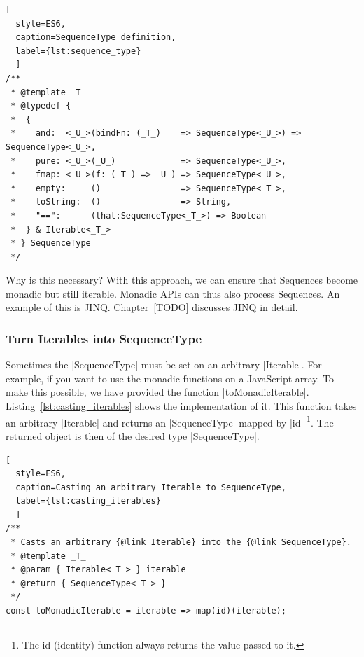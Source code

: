 \begin{lstlisting}[
  style=ES6, 
  caption=SequenceType definition,
  label={lst:sequence_type}
  ]
/**
 * @template _T_
 * @typedef {
 *  {
 *    and:  <_U_>(bindFn: (_T_)    => SequenceType<_U_>) => SequenceType<_U_>,
 *    pure: <_U_>(_U_)             => SequenceType<_U_>,
 *    fmap: <_U_>(f: (_T_) => _U_) => SequenceType<_U_>,
 *    empty:     ()                => SequenceType<_T_>,
 *    toString:  ()                => String,
 *    "==":      (that:SequenceType<_T_>) => Boolean
 *  } & Iterable<_T_>
 * } SequenceType
 */
\end{lstlisting}

Why is this necessary? With this approach, we can ensure that Sequences become
monadic but still iterable. Monadic APIs can thus also process Sequences. An
example of this is JINQ. Chapter~\ref{TODO} discusses JINQ in detail.


\subsubsection{Turn Iterables into SequenceType}
\label{subsub:Turn Iterables into SequenceType}
Sometimes the |SequenceType| must be set on an arbitrary |Iterable|. For example,
if you want to use the monadic functions on a JavaScript array. To make this
possible, we have provided the function |toMonadicIterable|.
Listing~\ref{lst:casting_iterables} shows the
implementation of it. This function takes an arbitrary |Iterable| and returns an
|SequenceType| mapped by |id| \footnote{The id (identity) function always
returns the value passed to it.}. 
The returned object is then of the desired type |SequenceType|.

\begin{lstlisting}[
  style=ES6, 
  caption=Casting an arbitrary Iterable to SequenceType,
  label={lst:casting_iterables}
  ]
/**
 * Casts an arbitrary {@link Iterable} into the {@link SequenceType}.
 * @template _T_
 * @param { Iterable<_T_> } iterable
 * @return { SequenceType<_T_> }
 */
const toMonadicIterable = iterable => map(id)(iterable);
\end{lstlisting}
